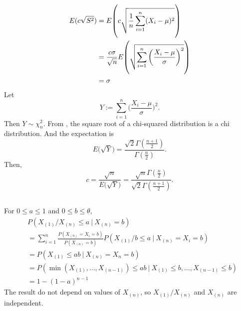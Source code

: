 \begin{align}
    E(c\sqrt{S^2})
        &= E\vast(c\sqrt{\frac{1}{n}\sum_{i=1}^n(X_i-\mu)^2}\vast) \\
        &= \frac{c\sigma}{\sqrt{n}}E\vast(\sqrt{\sum_{i=1}^n\bigg(\frac{X_i-\mu}{\sigma}\bigg)^2}\vast) \\
        &= \sigma
\end{align}
Let
\begin{equation}
    Y:=\sum_{i=1}^n\bigg(\frac{X_i-\mu}{\sigma}\bigg)^2.
\end{equation}
Then $Y\sim\chi^2_n$.
From \cite{chi}, the square root of a chi-squared distribution is a chi distribution.
And the expectation is
\begin{equation}
    E\big(\sqrt{Y}\big) = \frac{\sqrt{2}\Gamma(\frac{n+1}{2})}{\Gamma(\frac{n}{2})}.
\end{equation}
Then,
\begin{equation}
    c = \frac{\sqrt{n}}{E\big(\sqrt{Y}\big)}
      = \frac{\sqrt{n}\Gamma(\frac{n}{2})}{\sqrt{2}\Gamma(\frac{n+1}{2})}.
\end{equation}


\subsection{} %

For $0\le a\le 1$ and $0\le b\le\theta$,
\begin{align}
    & P(X_{(1)}/X_{(n)}\le a ~|~ X_{(n)}=b) \\
        &= \sum_{i=1}^n \frac{P(X_{(n)}=X_i=b)}{P(X_{(n)}=b)} P(X_{(1)}/b\le a ~|~ X_{(n)}=X_i=b) \\
        &= P(X_{(1)}\le ab ~|~ X_{(n)}=X_n=b) \\
        &= P(\min(X_{(1)},\dots,X_{(n-1)})\le ab ~|~ X_{(1)}\le b,\dots,X_{(n-1)}\le b) \\
        &= 1 - (1 - a)^{n-1}
\end{align}
The result do not depend on values of $X_{(n)}$,
so $X_{(1)}/X_{(n)}$ and $X_{(n)}$ are independent.

\subsection{} %



